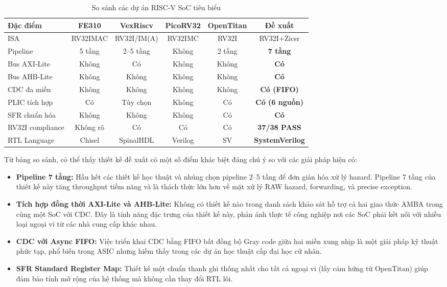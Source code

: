 \begin{table}[htbp]
\caption{So sánh các dự án RISC-V SoC tiêu biểu}
\label{tab:comparison}
\begin{center}
\begin{tabular}{|l|c|c|c|c|c|}
\hline
\textbf{Đặc điểm} & \textbf{FE310} & \textbf{VexRiscv} & \textbf{PicoRV32} & \textbf{OpenTitan} & \textbf{Đề xuất} \\ \hline
ISA & RV32IMAC & RV32I/IM(A) & RV32IMC & RV32I & RV32I+Zicsr \\ \hline
Pipeline & 5 tầng & 2--5 tầng & Không & 2 tầng & \textbf{7 tầng} \\ \hline
Bus AXI-Lite & Không & Có & Không & Không & \textbf{Có} \\ \hline
Bus AHB-Lite & Không & Không & Không & Không & \textbf{Có} \\ \hline
CDC đa miền & Không & Không & Không & Không & \textbf{Có (FIFO)} \\ \hline
PLIC tích hợp & Có & Tùy chọn & Không & Có & \textbf{Có (6 nguồn)} \\ \hline
SFR chuẩn hóa & Không & Không & Không & Có & \textbf{Có} \\ \hline
RV32I compliance & Không rõ & Có & Có & Có & \textbf{37/38 PASS} \\ \hline
RTL Language & Chisel & SpinalHDL & Verilog & SV & \textbf{SystemVerilog} \\ \hline
\end{tabular}
\end{center}
\end{table}

Từ bảng so sánh, có thể thấy thiết kế đề xuất có một số điểm khác biệt đáng chú ý so với các giải pháp hiện có:

\begin{itemize}
    \item \textbf{Pipeline 7 tầng:} Hầu hết các thiết kế học thuật và nhúng chọn pipeline 2--5 tầng để đơn giản hóa xử lý hazard. Pipeline 7 tầng của thiết kế này tăng throughput tiềm năng và là thách thức lớn hơn về mặt xử lý RAW hazard, forwarding, và precise exception.
    \item \textbf{Tích hợp đồng thời AXI-Lite và AHB-Lite:} Không có thiết kế nào trong danh sách khảo sát hỗ trợ cả hai giao thức AMBA trong cùng một SoC với CDC. Đây là tính năng đặc trưng của thiết kế này, phản ánh thực tế công nghiệp nơi các SoC phải kết nối với nhiều loại ngoại vi từ các nhà cung cấp khác nhau.
    \item \textbf{CDC với Async FIFO:} Việc triển khai CDC bằng FIFO bất đồng bộ Gray code giữa hai miền xung nhịp là một giải pháp kỹ thuật phức tạp, phổ biến trong ASIC nhưng hiếm thấy trong các dự án học thuật cấp đại học cử nhân.
    \item \textbf{SFR Standard Register Map:} Thiết kế một chuẩn thanh ghi thống nhất cho tất cả ngoại vi (lấy cảm hứng từ OpenTitan) giúp đảm bảo tính mở rộng của hệ thống mà không cần thay đổi RTL lõi.
\end{itemize}

